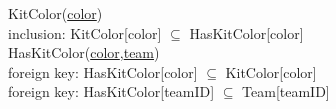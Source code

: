 {\color{ForestGreen}KitColor(\underline{color})}\\
{\color{Orange}\hspace{2mm} inclusion: {\color{Magenta}KitColor[color] $\subseteq$ HasKitColor[color]}} \\

{\color{ForestGreen}HasKitColor(\underline{color},\underline{team})}\\
{\color{Orange}\hspace{2mm} foreign key: {\color{Magenta}HasKitColor[color] $\subseteq$ KitColor[color]}} \\
{\color{Orange}\hspace{2mm} foreign key: {\color{Magenta}HasKitColor[teamID] $\subseteq$ Team[teamID]}} \\




